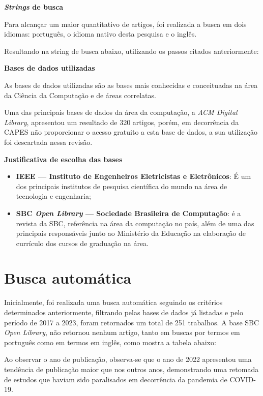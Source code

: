 \textbf{\textit{Strings} de busca}

Para alcançar um maior quantitativo de artigos, foi realizada a busca em dois idiomas: português, o idioma nativo desta pesquisa e o inglês.


Resultando na string de busca abaixo, utilizando os passos citados anteriormente:




\textbf{Bases de dados utilizadas}

As bases de dados utilizadas são as bases mais conhecidas e conceituadas na área da Ciência da Computação e de áreas correlatas.



Uma das principais bases de dados da área da computação, a \textit{\gls{ACM} Digital Library}, apresentou um resultado de 320 artigos, porém, em decorrência da \gls{CAPES} não proporcionar o acesso gratuito a esta base de dados, a sua utilização foi descartada nessa revisão.


\textbf{Justificativa de escolha das bases}
\begin{itemize}
    \item \textbf{IEEE — Instituto de Engenheiros Eletricistas e Eletrônicos}: É um dos principais institutos de pesquisa científica do mundo na área de tecnologia e engenharia;
    \item \textbf{SBC \textit{Open Library} — Sociedade Brasileira de Computação}: é a revista da \gls{SBC}, referência na área da computação no país, além de uma das principais responsáveis junto ao Ministério da Educação na elaboração de currículo dos cursos de graduação na área.
\end{itemize}


\section{Busca automática}
Inicialmente, foi realizada uma busca automática seguindo os critérios determinados anteriormente, filtrando pelas bases de dados já listadas e pelo período de 2017 a 2023, foram retornados um total de 251 trabalhos. A base SBC \textit{Open Library}, não retornou nenhum artigo, tanto em buscas por termos em português como em termos em inglês, como mostra a tabela abaixo: 



Ao observar o ano de publicação, observa-se que o ano de 2022 apresentou uma tendência de publicação maior que nos outros anos,  demonstrando uma retomada de estudos que haviam sido paralisados em decorrência da pandemia de COVID-19.

